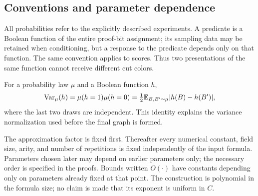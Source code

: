 \subsection{Conventions and parameter dependence}

All probabilities refer to the explicitly described experiments.
A predicate is a Boolean function of the entire proof-bit assignment;
its sampling data may be retained when conditioning, but a response to
the predicate depends only on that function.  The same convention applies
to scores.  Thus two presentations of the same function cannot receive
different cut colors.

For a probability law $\mu$ and a Boolean function $h$,
\[
 \operatorname{Var}_\mu(h)=\mu(h=1)\mu(h=0)
 =\tfrac12\mathbb E_{B,B'\sim\mu}\lvert h(B)-h(B')\rvert,
\]
where the last two draws are independent.  This identity explains the
variance normalization used before the final graph is formed.

The approximation factor is fixed first.  Thereafter every numerical
constant, field size, arity, and number of repetitions is fixed independently
of the input formula.  Parameters chosen later may depend on earlier
parameters only; the necessary order is specified in the proofs.  Bounds
written $O(\cdot)$ have constants depending only on parameters already
fixed at that point.  The construction is polynomial in the formula size;
no claim is made that its exponent is uniform in $C$.
